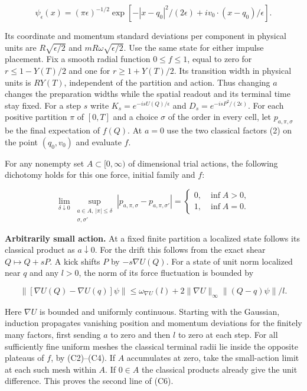 \documentclass[11pt,a4paper]{article}
\begin{document}
\[
 \psi_\epsilon(x)=(\pi\epsilon)^{-1/2}
 \exp[-|x-q_0|^2/(2\epsilon)+i v_0\cdot(x-q_0)/\epsilon].
\]

Its coordinate and momentum standard deviations per component in
physical units are \(R\sqrt{\epsilon/2}\) and
\(mR\omega\sqrt{\epsilon/2}\). Use the same state for either impulse
placement. Fix a smooth radial function \(0\le f\le1\), equal to zero
for \(r\le1-Y(T)/2\) and one for \(r\ge1+Y(T)/2\). Its transition width
in physical units is \(R Y(T)\), independent of the partition and
action. Thus changing \(a\) changes the preparation widths while the
spatial readout and its terminal time stay fixed. For a step \(s\) write
\(K_s=e^{-isU(Q)/\epsilon}\) and \(D_s=e^{-isP^2/(2\epsilon)}\). For
each positive partition \(\pi\) of \([0,T]\) and a choice \(\sigma\) of
the order in every cell, let \(p_{a,\pi,\sigma}\) be the final
expectation of \(f(Q)\). At \(a=0\) use the two classical factors (2) on
the point \((q_0,v_0)\) and evaluate \(f\).

For any nonempty set \(A\subset[0,\infty)\) of dimensional trial
actions, the following dichotomy holds for this one force, initial
family and \(f\):

\[
 \lim_{\delta\downarrow0}
 \sup_{\substack{a\in A,\ |\pi|\le\delta\\\sigma,\sigma'}}
 |p_{a,\pi,\sigma}-p_{a,\pi,\sigma'}|
 =\begin{cases}0,&\inf A>0,\\1,&\inf A=0.\end{cases} \tag{C6}
\]

\textbf{Arbitrarily small action.} At a fixed finite partition a
localized state follows its classical product as \(a\downarrow0\). For
the drift this follows from the exact shear \(Q\mapsto Q+sP\). A kick
shifts \(P\) by \(-s\nabla U(Q)\). For a state of unit norm localized
near \(q\) and any \(l>0\), the norm of its force fluctuation is bounded
by

\[
 \|[\nabla U(Q)-\nabla U(q)]\psi\|
 \le \omega_{\nabla U}(l)+2\|\nabla U\|_\infty
                                     \|(Q-q)\psi\|/l .
\]

Here \(\nabla U\) is bounded and uniformly continuous. Starting with the
Gaussian, induction propagates vanishing position and momentum
deviations for the finitely many factors, first sending \(a\) to zero
and then \(l\) to zero at each step. For all sufficiently fine uniform
meshes the classical terminal radii lie inside the opposite plateaus of
\(f\), by (C2)--(C4). If \(A\) accumulates at zero, take the
small-action limit at each such mesh within \(A\). If \(0\in A\) the
classical products already give the unit difference. This proves the
second line of (C6).
\end{document}

